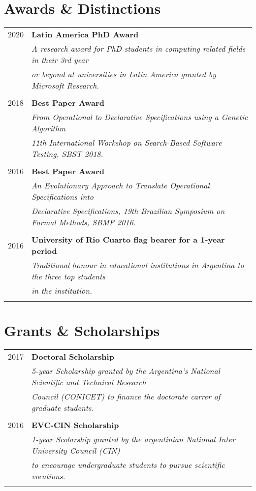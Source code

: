 \documentclass[a4paper,10pt]{article} %
\begin{document}
\section{Awards \& Distinctions}
\begin{tabular}{rl}
\\
\textsc{2020} & \textbf{Latin America PhD Award} \\
& \textit{A research award for PhD students in computing related fields in their 3rd year} \\
& \textit{or beyond at universities in Latin America granted by Microsoft Research.} \\ & \\

\textsc{2018} & \textbf{Best Paper Award} \\ 
& \textit{From Operational to Declarative Specifications using a Genetic Algorithm} \\
& \textit{11th International Workshop on Search-Based Software Testing, SBST 2018.} \\ & \\

\textsc{2016} & \textbf{Best Paper Award} \\ 
& \textit{An Evolutionary Approach to Translate Operational Specifications into } \\
& \textit{Declarative Specifications, 19th Brazilian Symposium on Formal Methods, SBMF 2016.} \\ & \\

\textsc{2016} & \textbf{University of Rio Cuarto flag bearer for a 1-year period} \\ 
& \textit{Traditional honour in educational institutions in Argentina to the three top students} \\ 
& \textit{in the institution.} \\ & \\
\end{tabular}

\section{Grants \& Scholarships}
\begin{tabular}{rl}
\\
\textsc{2017} & \textbf{Doctoral Scholarship} \\ 
& \textit{5-year Scholarship granted by the Argentina's National Scientific and Technical Research} \\
& \textit{Council (CONICET) to finance the doctorate carrer of graduate students.} \\ & \\

\textsc{2016} & \textbf{EVC-CIN Scholarship} \\ 
& \textit{1-year Scolarship granted by the argentinian National Inter University Council (CIN)} \\
& \textit{to encourage undergraduate students to pursue scientific vocations.} \\ & \\

\end{tabular}
\end{document}
